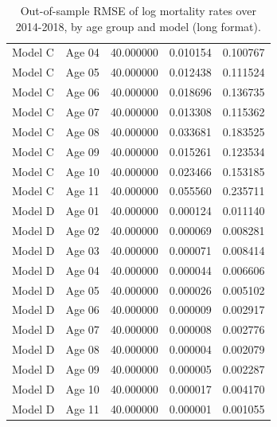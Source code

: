 \begin{table}[ht]
\begin{tabular}{llrrr}
Model C & Age 04 & 40.000000 & 0.010154 & 0.100767 \\
Model C & Age 05 & 40.000000 & 0.012438 & 0.111524 \\
Model C & Age 06 & 40.000000 & 0.018696 & 0.136735 \\
Model C & Age 07 & 40.000000 & 0.013308 & 0.115362 \\
Model C & Age 08 & 40.000000 & 0.033681 & 0.183525 \\
Model C & Age 09 & 40.000000 & 0.015261 & 0.123534 \\
Model C & Age 10 & 40.000000 & 0.023466 & 0.153185 \\
Model C & Age 11 & 40.000000 & 0.055560 & 0.235711 \\
Model D & Age 01 & 40.000000 & 0.000124 & 0.011140 \\
Model D & Age 02 & 40.000000 & 0.000069 & 0.008281 \\
Model D & Age 03 & 40.000000 & 0.000071 & 0.008414 \\
Model D & Age 04 & 40.000000 & 0.000044 & 0.006606 \\
Model D & Age 05 & 40.000000 & 0.000026 & 0.005102 \\
Model D & Age 06 & 40.000000 & 0.000009 & 0.002917 \\
Model D & Age 07 & 40.000000 & 0.000008 & 0.002776 \\
Model D & Age 08 & 40.000000 & 0.000004 & 0.002079 \\
Model D & Age 09 & 40.000000 & 0.000005 & 0.002287 \\
Model D & Age 10 & 40.000000 & 0.000017 & 0.004170 \\
Model D & Age 11 & 40.000000 & 0.000001 & 0.001055 \\
\hline
\end{tabular}
\caption{Out-of-sample RMSE of log mortality rates over 2014-2018, by age group and model (long format).}
\label{tab:revised_table_e3_long}
\end{table}
